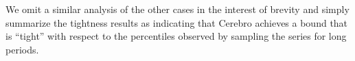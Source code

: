
We omit a similar analysis of the other cases in the interest of brevity and
simply summarize the tightness results as indicating that Cerebro achieves a
bound that is ``tight'' with respect to the percentiles observed by sampling
the series for long periods.

%

